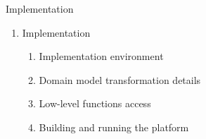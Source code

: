 \documentclass{beamer}
\begin{document}
\setcounter{enumi_chapter}{\value{enumi}}


\begin{frame}{Implementation}

	\begin{enumerate}
		\setcounter{enumi}{\value{enumi_chapter}}

	\item Implementation

		\begin{enumerate}
			\item Implementation environment \pause
			\item Domain model transformation details \pause
			\item Low-level functions access \pause
			\item Building and running the platform
		\end{enumerate}

	\end{enumerate}

\end{frame}

\setcounter{enumi_chapter}{\value{enumi}}
\end{document}
